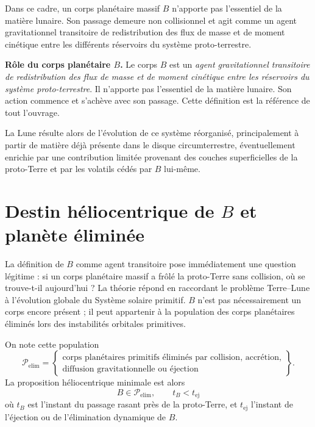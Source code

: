 \documentclass[11pt,a4paper,openany]{report}
\begin{document}
Dans ce cadre, un corps planétaire massif $B$ n'apporte pas l'essentiel de la matière lunaire. Son
passage demeure non collisionnel et agit comme un agent gravitationnel transitoire de
redistribution des flux de masse et de moment cinétique entre les différents réservoirs du système
proto-terrestre.

\begin{definition}
\textbf{Rôle du corps planétaire $B$.} Le corps $B$ est un \emph{agent gravitationnel transitoire
de redistribution des flux de masse et de moment cinétique entre les réservoirs du système
proto-terrestre}. Il n'apporte pas l'essentiel de la matière lunaire. Son action commence et
s'achève avec son passage. Cette définition est la référence de tout l'ouvrage.
\end{definition}

La Lune résulte alors de l'évolution de ce système réorganisé, principalement à partir de matière
déjà présente dans le disque circumterrestre, éventuellement enrichie par une contribution
limitée provenant des couches superficielles de la proto-Terre et par les volatils cédés par $B$
lui-même.

\section{Destin héliocentrique de \texorpdfstring{$B$}{B} et planète éliminée}
\label{sec:destinB}

La définition de $B$ comme agent transitoire pose immédiatement une question légitime : si un
corps planétaire massif a frôlé la proto-Terre sans collision, où se trouve-t-il aujourd'hui ? La
théorie répond en raccordant le problème Terre--Lune à l'évolution globale du Système solaire
primitif. $B$ n'est pas nécessairement un corps encore présent ; il peut appartenir à la
population des corps planétaires éliminés lors des instabilités orbitales primitives.

On note cette population
\begin{equation}
\mathcal{P}_{\mathrm{elim}}=
\left\{\begin{array}{l}
\text{corps planétaires primitifs éliminés par collision, accrétion,}\\
\text{diffusion gravitationnelle ou éjection}
\end{array}\right\}.
\label{eq:Pelim}
\end{equation}
La proposition héliocentrique minimale est alors
\begin{equation}
\boxed{\;B\in\mathcal{P}_{\mathrm{elim}},\qquad t_B<t_{\mathrm{ej}}\;}
\label{eq:tB-tej}
\end{equation}
où $t_B$ est l'instant du passage rasant près de la proto-Terre, et $t_{\mathrm{ej}}$ l'instant de
l'éjection ou de l'élimination dynamique de $B$.
\end{document}
